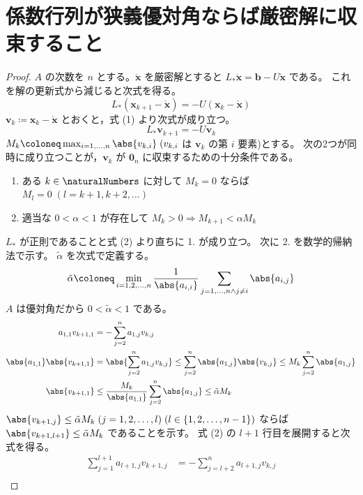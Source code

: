     \section{係数行列が狭義優対角ならば厳密解に収束すること}
        \begin{proof}
            $A$ の次数を $n$ とする。$\mathring{\bm{x}}$ を厳密解とすると $L_* \mathring{\bm{x}} = \bm{b} - U\mathring{\bm{x}}$ である。
            これを解の更新式から減じると次式を得る。
            \[ L_* (\bm{x}_{k+1} - \mathring{\bm{x}}) = -U(\bm{x}_k - \mathring{\bm{x}}) \tag{1} \]
            $\bm{v}_k \coloneq \bm{x}_k - \mathring{\bm{x}}$ とおくと，式 (1) より次式が成り立つ。
            \[ L_* \bm{v}_{k+1} = -U\bm{v}_k \tag{2} \]
            $M_k \coloneq \max_{i=1,\dots,n} \abs{v_{k,i}}\;(v_{k,i}$ は $\bm{v}_k$ の第 $i$ 要素)とする。
            次の2つが同時に成り立つことが，$\bm{v}_k$ が $\bm{0}_n$ に収束するための十分条件である。
            \begin{enumerate}
                \item ある $k \in \naturalNumbers$ に対して $M_k = 0$ ならば $M_l = 0\;(l=k+1,k+2,\dots)$
                \item 適当な $0 < \alpha < 1$ が存在して $M_k > 0 \Rightarrow M_{k+1} < \alpha M_k$
            \end{enumerate}
            $L_*$ が正則であることと式 (2) より直ちに 1. が成り立つ。
            次に 2. を数学的帰納法で示す。
            $\tilde{\alpha}$ を次式で定義する。
            \[ \tilde{\alpha} \coloneq \min_{i=1,2,\dots,n} \frac{1}{\abs{a_{i,i}}} \sum_{j=1,\dots,n \wedge j\neq i} \abs{a_{i,j}} \]
            $A$ は優対角だから $0 < \tilde{\alpha} < 1$ である。
            \begin{align*}
                a_{1,1} v_{k+1, 1} &= -\sum_{j=2}^n a_{1,j}v_{k,j} \\
                \abs{a_{1,1}} \abs{v_{k+1, 1}} &= \abs{\sum_{j=2}^n a_{1,j}v_{k,j}} \leq \sum_{j=2}^n \abs{a_{1,j}}\abs{v_{k,j}} \leq M_k \sum_{j=2}^n \abs{a_{1,j}} \\
                \abs{v_{k+1, 1}} &\leq \frac{M_k}{\abs{a_{1,1}}} \sum_{j=2}^n \abs{a_{1,j}} \leq \tilde{\alpha}M_k
            \end{align*}
            $\abs{v_{k+1, j}} \leq \tilde{\alpha} M_k\;(j=1,2,\dots,l)\;(l\in\{1,2,\dots,n-1\})$ ならば $\abs{v_{k+1, l+1}} \leq \tilde{\alpha} M_k$ であることを示す。
            式 (2) の $l+1$ 行目を展開すると次式を得る。
            \begin{align*}
                \sum_{j=1}^{l+1} a_{l+1,j} v_{k+1, j} &= -\sum_{j=l+2}^n a_{l+1,j}v_{k,j} \\

\end{align*}
\end{proof}

